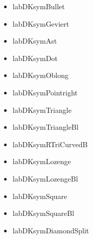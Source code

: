 \documentclass[a4paper]{article}%
\begin{document}
\begin{itemize}[labDKBullet]
\item%
    labDKsymBullet
\end{itemize}
\begin{itemize}[labDKGeviert]
\item%
    labDKsymGeviert
\end{itemize}
\begin{itemize}[labDKAst]
\item%
    labDKsymAst
\end{itemize}
\begin{itemize}[labDKDot]
\item%
    labDKsymDot
\end{itemize}
\begin{itemize}[labDKOblong]
\item%
    labDKsymOblong
\end{itemize}
\begin{itemize}[labDKPointright]
\item%
    labDKsymPointright
\end{itemize}
\begin{itemize}[labDKTriangle]
\item%
    labDKsymTriangle
\end{itemize}
\begin{itemize}[labDKTriangleBl]
\item%
    labDKsymTriangleBl
\end{itemize}
\begin{itemize}[labDKRTriCurvedB]
\item%
    labDKsymRTriCurvedB
\end{itemize}
\begin{itemize}[labDKLozenge]
\item%
    labDKsymLozenge
\end{itemize}
\begin{itemize}[labDKLozengeBl]
\item%
    labDKsymLozengeBl
\end{itemize}
\begin{itemize}[labDKSquare]
\item%
    labDKsymSquare
\end{itemize}
\begin{itemize}[labDKSquareBl]
\item%
    labDKsymSquareBl
\end{itemize}
\begin{itemize}[labDKDiamondSplit]
\item%
    labDKsymDiamondSplit
\end{itemize}
\end{document}
